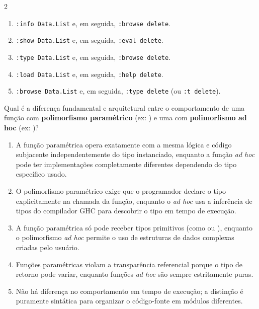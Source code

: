 \documentclass[a4paper,10pt,brazil]{article}
\begin{document}
\begin{multicols}{2}
\begin{enumerate}
  \item \texttt{:info Data.List} e, em seguida, \texttt{:browse delete}.

  \item \texttt{:show Data.List} e, em seguida, \texttt{:eval delete}.

  \item \texttt{:type Data.List} e, em seguida, \texttt{:browse delete}.

  \item \texttt{:load Data.List} e, em seguida, \texttt{:help delete}.

  \item \texttt{:browse Data.List} e, em seguida, \texttt{:type delete} (ou \texttt{:t delete}).


\end{enumerate}

Qual é a diferença fundamental e arquitetural entre o comportamento de uma função com \textbf{polimorfismo paramétrico} (ex: ) e uma com \textbf{polimorfismo ad hoc} (ex: )?

\begin{enumerate}
  \item A função paramétrica opera exatamente com a mesma lógica e código subjacente independentemente do tipo instanciado, enquanto a função \emph{ad hoc} pode ter implementações completamente diferentes dependendo do tipo específico usado.

  \item O polimorfismo paramétrico exige que o programador declare o tipo explicitamente na chamada da função, enquanto o \emph{ad hoc} usa a inferência de tipos do compilador GHC para descobrir o tipo em tempo de execução.

  \item A função paramétrica só pode receber tipos primitivos (como  ou ), enquanto o polimorfismo \emph{ad hoc} permite o uso de estruturas de dados complexas criadas pelo usuário.

  \item Funções paramétricas violam a transparência referencial porque o tipo de retorno pode variar, enquanto funções \emph{ad hoc} são sempre estritamente puras.

  \item Não há diferença no comportamento em tempo de execução; a distinção é puramente sintática para organizar o código-fonte em módulos diferentes.



\end{enumerate}
\end{multicols}
\end{document}
